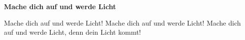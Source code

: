 \documentclass[10pt]{article}
\begin{document}
{\Large
\begin{guitar}
    \textbf{Mache dich auf und werde Licht}

    Mache dich auf und werde Licht!
    Mache dich auf und werde Licht!
    Mache dich auf und werde Licht,
    denn dein Licht kommt!
\end{guitar}
}
\end{document}
